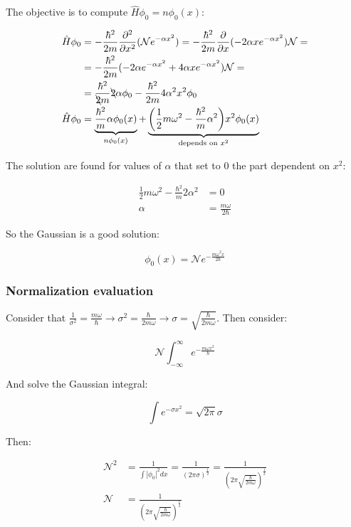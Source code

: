   The objective is to compute $\hat{H}\phi_0 = n\phi_0(x)$:

  \begin{align*}
    \hat{H}\phi_0 &= -\frac{\hbar^2}{2m}\frac{\partial^2}{\partial x^2}(\mathcal{N}e^{-\alpha x^2}) = -\frac{\hbar^2}{2m}\frac{\partial}{\partial x}(-2\alpha x e^{-\alpha x^2})\mathcal{N}=\\
                  &=-\frac{\hbar^2}{2m}(-2\alpha e^{-\alpha x^2}+4\alpha xe^{-\alpha x^2})\mathcal{N}=\\
                  &= \frac{\hbar^2}{\bcancel{2}m}\bcancel{2}\alpha\phi_0 -\frac{\hbar^2}{2m}4\alpha^2 x^2\phi_0\\
    \hat{H}\phi_0 &= \underbrace{\frac{\hbar^2}{m}\alpha\phi_0(x)}_{n\phi_0(x)} + \underbrace{\biggl(\frac{1}{2}m\omega^2-\frac{\hbar^2}{m}\alpha^2\biggr)x^2\phi_0(x)}_{\text{depends on }x^2}
  \end{align*}

  The solution are found for values of $\alpha$ that set to $0$ the part dependent on $x^2$:

  \begin{align*}
    \frac{1}{2}m\omega^2 -\frac{\hbar^2}{m}2\alpha^2 &= 0\\
    \alpha &= \frac{m\omega}{2\hbar}
  \end{align*}

  So the Gaussian is a good solution:

  $$\phi_0(x) = \mathcal{N}e^{-\frac{m\omega^2x}{2\hbar}}$$

    \subsubsection{Normalization evaluation}
    Consider that $\frac{1}{\sigma^2} = \frac{m\omega}{\hbar} \rightarrow \sigma^2 = \frac{\hbar}{2m\omega}\rightarrow \sigma = \sqrt{\frac{\hbar}{2m\omega}}$.
    Then consider:

    $$\mathcal{N}\int_{-\infty}^\infty e^{-\frac{m\omega x^2}{\hbar}}$$

    And solve the Gaussian integral:

    $$\int e^{-\sigma x^2} = \sqrt{2\pi}\sigma$$

    Then:

    \begin{align*}
      \mathcal{N}^2 &= \frac{1}{\int|\phi_0|^2dx} = \frac{1}{(2\pi\sigma)^{\frac{1}{2}}} = \frac{1}{(2\pi\sqrt{\frac{\hbar}{2m\omega}})^\frac{1}{2}}\\
      \mathcal{N} &= \frac{1}{(2\pi\sqrt{\frac{\hbar}{2m\omega}})^{\frac{1}{4}}}
    \end{align*}

